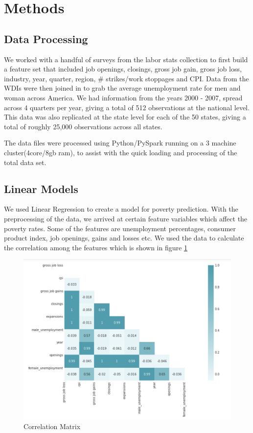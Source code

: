 \documentclass[11pt,letterpaper]{article}
\begin{document}
\section{Methods}

\subsection{Data Processing}
\label{ssec:dataproc}

We worked with a handful of surveys from the labor stats collection to first build a feature set that included job openings, closings, gross job gain, gross job loss, industry, year, quarter, region, \# strikes/work stoppages and CPI. Data from the WDIs were then joined in to grab the average unemployment rate for men and woman across America. We had information from the years 2000 - 2007, spread across 4 quarters per year, giving a total of 512 observations at the national level. This data was also replicated at the state level for each of the 50 states, giving a total of roughly 25,000 observations across all states.

The data files were processed using Python/PySpark running on a 3 machine cluster(4core/8gb ram), to assist with the quick loading and processing of the total data set. 

\subsection{Linear Models}
\label{ssec:lm}

We used Linear Regression to create a model for poverty prediction. With the preprocessing of the data, we arrived at certain feature variables which affect the poverty rates. Some of the features are unemployment percentages, consumer product index, job openings, gains and losses etc. We used the data to calculate the correlation among the features which is shown in figure \ref{fig:Correlation Matrix}

\begin{figure}
\centering
\includegraphics[width=\linewidth]{"./pictures/Correlation_Matrix"}
\caption{Correlation Matrix}
\label{fig:Correlation Matrix}
\end{figure}
\end{document}

